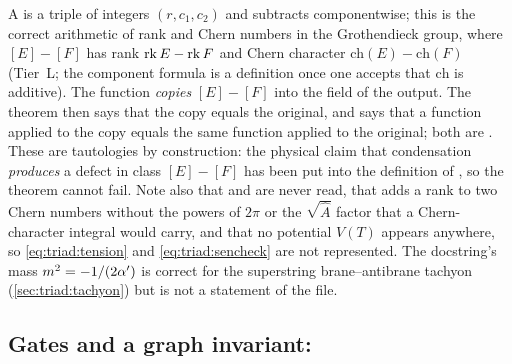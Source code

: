 \begin{leanbox}
A  is a triple of integers $(r,c_1,c_2)$ and  subtracts componentwise;
this is the correct arithmetic of rank and Chern numbers in the Grothendieck group, where
$[E]-[F]$ has rank $\operatorname{rk} E-\operatorname{rk} F$ and Chern character $\mathrm{ch}(E)-\mathrm{ch}(F)$ (Tier~L;
the component formula is a definition once one accepts that $\mathrm{ch}$ is additive). The
function  \emph{copies} $[E]-[F]$ into the field
 of the output. The theorem
 then says that the copy equals the original,
and  says that a function applied to the
copy equals the same function applied to the original; both are . These are
tautologies by construction: the physical claim that condensation \emph{produces} a defect in
class $[E]-[F]$ has been put into the definition of , so the theorem
cannot fail. Note also that  and  are never read, that
 adds a rank to two Chern numbers without the powers of $2\pi$ or the
$\sqrt{\hat A}$ factor that a Chern-character integral would carry, and that no potential
$V(T)$ appears anywhere, so \eqref{eq:triad:tension} and \eqref{eq:triad:sencheck} are not
represented. The docstring's mass $m^2=-1/(2\alpha')$ is correct for the superstring
brane--antibrane tachyon (\cref{sec:triad:tachyon}) but is not a statement of the file.
\end{leanbox}

\subsection{Gates and a graph invariant: }

